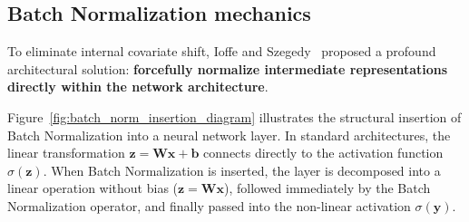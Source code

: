 \subsection{Batch Normalization mechanics}
\label{sec:batch_norm_algorithm}
\label{sec:why_gamma_beta}
\label{sec:batch_norm_backprop}
\label{sec:bn_train_vs_test}

To eliminate internal covariate shift, Ioffe and Szegedy~\cite{ioffe2015batch} proposed a profound architectural solution: \textbf{forcefully normalize intermediate representations directly within the network architecture}.

Figure~\ref{fig:batch_norm_insertion_diagram} illustrates the structural insertion of Batch Normalization into a neural network layer. In standard architectures, the linear transformation $\mathbf{z} = \mathbf{W}\mathbf{x} + \mathbf{b}$ connects directly to the activation function $\sigma(\mathbf{z})$. When Batch Normalization is inserted, the layer is decomposed into a linear operation without bias ($\mathbf{z} = \mathbf{W}\mathbf{x}$), followed immediately by the Batch Normalization operator, and finally passed into the non-linear activation $\sigma(\mathbf{y})$.

